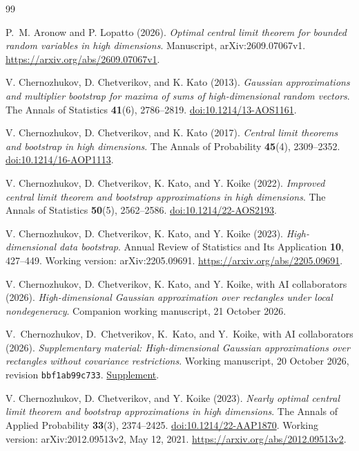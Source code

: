 \documentclass[11pt,letterpaper]{article}
\theoremstyle{remark}
\begin{document}
\begin{thebibliography}{99}
\setlength{\itemsep}{3pt}
{}
P.~M. Aronow and P. Lopatto (2026).
\emph{Optimal central limit theorem for bounded random variables in high dimensions}.
Manuscript, arXiv:2609.07067v1.
\url{https://arxiv.org/abs/2609.07067v1}.

V. Chernozhukov, D. Chetverikov, and K. Kato (2013).
\emph{Gaussian approximations and multiplier bootstrap for maxima of
sums of high-dimensional random vectors}.
The Annals of Statistics \textbf{41}(6), 2786--2819.
\href{https://doi.org/10.1214/13-AOS1161}{doi:10.1214/13-AOS1161}.

V. Chernozhukov, D. Chetverikov, and K. Kato (2017).
\emph{Central limit theorems and bootstrap in high dimensions}.
The Annals of Probability \textbf{45}(4), 2309--2352.
\href{https://doi.org/10.1214/16-AOP1113}{doi:10.1214/16-AOP1113}.

V. Chernozhukov, D. Chetverikov, K. Kato, and Y. Koike (2022).
\emph{Improved central limit theorem and bootstrap approximations in
high dimensions}. The Annals of Statistics \textbf{50}(5), 2562--2586.
\href{https://doi.org/10.1214/22-AOS2193}{doi:10.1214/22-AOS2193}.

V. Chernozhukov, D. Chetverikov, K. Kato, and Y. Koike (2023).
\emph{High-dimensional data bootstrap}.
Annual Review of Statistics and Its Application \textbf{10}, 427--449.
Working version: arXiv:2205.09691.
\url{https://arxiv.org/abs/2205.09691}.

V. Chernozhukov, D. Chetverikov, K. Kato, and Y. Koike,
with AI collaborators (2026).
\emph{High-dimensional Gaussian approximation over rectangles under
local nondegeneracy}. Companion working manuscript, 21 October 2026.

V.~Chernozhukov, D.~Chetverikov, K.~Kato, and Y.~Koike,
with AI collaborators (2026).
\emph{Supplementary material: High-dimensional Gaussian approximations
over rectangles without covariance restrictions}.
Working manuscript, 20 October 2026, revision \texttt{bbf1ab99c733}.
\href{https://github.com/VC2015/HDCLTs/blob/bbf1ab99c733a398c181ca8c9f5a243a41f258c6/research-rectangle-clt-singular/Rectangle_CLT_Supplement.pdf}{Supplement}.

V. Chernozhukov, D. Chetverikov, and Y. Koike (2023).
\emph{Nearly optimal central limit theorem and bootstrap approximations
in high dimensions}.
The Annals of Applied Probability \textbf{33}(3), 2374--2425.
\href{https://doi.org/10.1214/22-AAP1870}{doi:10.1214/22-AAP1870}.
Working version: arXiv:2012.09513v2, May 12, 2021.
\url{https://arxiv.org/abs/2012.09513v2}.


\end{thebibliography}
\end{document}
